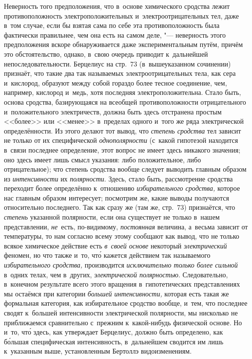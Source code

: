 Неверность того предположения, что в~основе химического сродства лежит
противоположность электроположительных и~электроотрицательных тел, даже в~том
случае, если бы взятая сама по себе эта противоположность была фактически
правильнее, чем она есть на самом деле, "--- неверность этого предположения
вскоре обнаруживается даже экспериментальным путём, причём это обстоятельство,
однако, в~свою очередь приводит к~дальнейшей непоследовательности. Берцелиус на
стр.~73 (в~вышеуказанном сочинении) признаёт, что такие два так называемых
электроотрицательных тела, как сера и~кислород, образуют между собой гораздо
более тесное соединение, чем, например, кислород и~медь, хотя последняя
электроположительна. Стало быть, основа сродства, базирующаяся на всеобщей
противоположности отрицательного и~положительного электричеств, должна быть
здесь отстранена простым <<более>> или <<менее>> в~пределах
одного и~того же ряда электрической определённости. Из этого делают тот вывод,
что {\em степень сродства} тел зависит не только от их специфической
{\em однополярности} (с~какой гипотезой находится в~связи последнее
определение, этот вопрос не имеет здесь никакого значения; оно здесь имеет лишь
смысл указания: либо положительное, либо отрицательное); что
степень сродства вообще следует выводить главным образом из {\em интенсивности} их
{\em полярности}. Здесь, стало быть, рассмотрение сродства переходит
более определённо к~отношению {\em избирательного сродства,} которое нас
главным образом интересует; посмотрим же, какие выводы получаются относительно
последнего. Так как сразу же (там же, стр.~73) признаётся, что {\em степень}
указанной полярности, если она существует не только в~нашем представлении,
{\em не}~есть, по-видимому, {\em постоянная} величина, а~весьма зависит от
температуры, то нам согласно всему этому сообщают как вывод, что не только
всякое химическое действие есть {\em в~своей основе} некоторый
{\em электрический} феномен, но что также и~то, чт\'{о} кажется действием так
называемого {\em избирательного сродства,} производится
{\em исключительно только более сильной} в~одних телах, чем в~других,
{\em электрической полярностью}. Следовательно, в~конечном результате всего этого
вращения в~гипотетических представлениях мы остаёмся при категории
{\em большей интенсивности,} которая есть такая же формальная категория,
как избирательное сродство вообще, и~тем, что последнее сводят к~большей
интенсивности электрической полярности, мы нисколько не приближаемся сравнительно
с~прежним к~какой-нибудь физической основе. Но и~то, чт\'{о} здесь, как
утверждает Берцелиус, должно быть определено, как б\'{о}льшая специфическая
интенсивность, в~дальнейшем сводится им лишь к~указанным выше, установленным
Бертоллэ видоизменениям.

